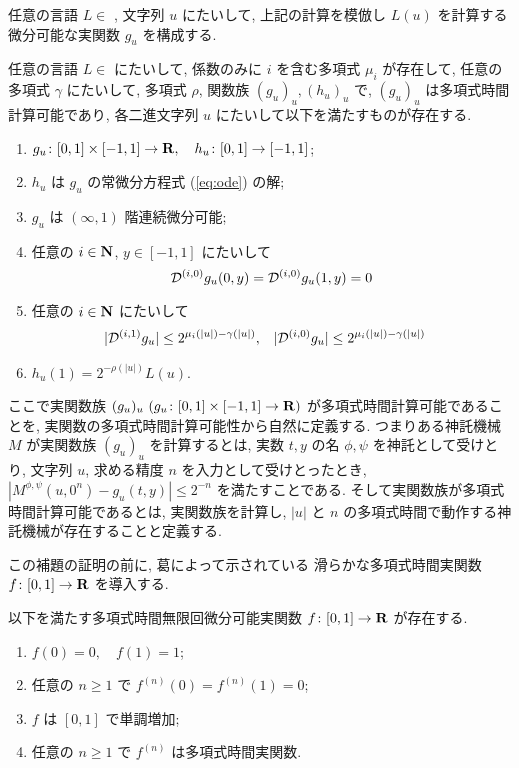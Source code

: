 任意の言語 $L \in $ \PSPACE, 文字列 $u$ にたいして,
上記の計算を模倣し $L(u)$ を計算する微分可能な実関数 $g_u$ を構成する.

\begin{lemma}
 \label{DifferentiableFamily}
 任意の言語 $L \in $ \PSPACE にたいして, 
 係数のみに $i$ を含む多項式 $\mu_i$ が存在して,
 任意の多項式 $\gamma$ にたいして,
 多項式 $\rho$, 関数族 $(g_u)_u, (h_u)_u$ で, 
 $(g_u)_u$ は多項式時間計算可能であり,
 各二進文字列 $u$ にたいして以下を満たすものが存在する.
 \begin{enumerate}
  \item $g_u\colon [0,1] \times [-1,1]\to \mathbf R, \quad h_u\colon [0,1] \to [-1,1]$;
  \item $h_u$ は $g_u$ の常微分方程式 (\ref{eq:ode}) の解; 
  \item $g_u$ は $(\infty, 1)$ 階連続微分可能;
  \item 任意の $i \in \mathbf N$, $y \in [-1,1]$ にたいして
	\begin{equation*}
	 \mathcal D^{(i, 0)} g_u(0,y) = \mathcal D^{(i, 0)} g_u(1,y) = 0 
	\end{equation*}
  \item 任意の $i \in \mathbf N$ にたいして
	\begin{align*}
	 |\mathcal D^{(i,1)} g_u| &\leq 2^{\mu_i (|u|) - \gamma(|u|)}, &
	 |\mathcal D^{(i,0)} g_u| &\leq 2^{\mu_i (|u|) - \gamma(|u|)}
	\end{align*}
  \item $h_u(1) = 2^{-\rho(|u|)}L(u)$.
 \end{enumerate}
\end{lemma}

 ここで実関数族 $(g_u)_u \ (g_u \colon [0,1] \times [-1, 1] \to \mathbf R)$ 
 が多項式時間計算可能であることを, 実関数の多項式時間計算可能性から自然に定義する.
 つまりある神託機械 $M$ が実関数族 $(g_u)_u$ を計算するとは,
 実数 $t,y$ の名 $\phi, \psi$ を神託として受けとり,
 文字列 $u$, 求める精度 $n$ を入力として受けとったとき,
 $|M^{\phi, \psi}(u, 0^n) - g_u(t, y)| \le 2^{-n}$ を満たすことである.
 そして実関数族が多項式時間計算可能であるとは,
 実関数族を計算し, $|u|$ と $n$ の多項式時間で動作する神託機械が存在することと定義する.

 この補題の証明の前に, 葛によって示されている
 滑らかな多項式時間実関数 $f \colon [0,1] \to \mathbf R$ を導入する.
 
 \begin{lemma}
  \label{SmoothFunction}
  以下を満たす多項式時間無限回微分可能実関数 $f \colon [0,1] \to \mathbf R$ が存在する.
  \begin{enumerate}
   \item $f(0) = 0, \quad f(1) = 1$;
   \item 任意の $n \ge 1$ で $f^{(n)}(0) = f^{(n)}(1) = 0$;
   \item $f$ は $[0,1]$ で単調増加;
   \item 任意の $n \ge 1$ で $f^{(n)}$ は多項式時間実関数.
  \end{enumerate}
 \end{lemma} 



